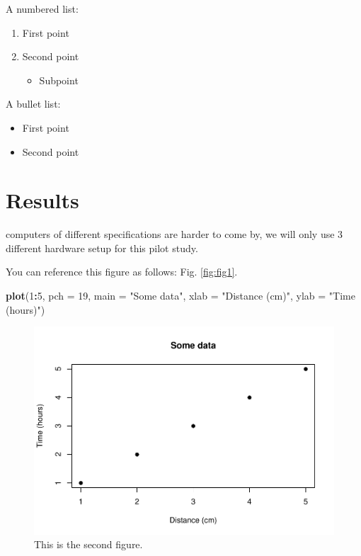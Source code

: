\documentclass[12pt,halfline,a4paper,]{ouparticle}
\newenvironment{Shaded}{\begin{snugshade}}{\end{snugshade}}
\newcommand{\AttributeTok}[1]{\textcolor[rgb]{0.13,0.29,0.53}{#1}}
\newcommand{\DecValTok}[1]{\textcolor[rgb]{0.00,0.00,0.81}{#1}}
\newcommand{\FunctionTok}[1]{\textcolor[rgb]{0.13,0.29,0.53}{\textbf{#1}}}
\newcommand{\NormalTok}[1]{#1}
\newcommand{\SpecialCharTok}[1]{\textcolor[rgb]{0.81,0.36,0.00}{\textbf{#1}}}
\newcommand{\StringTok}[1]{\textcolor[rgb]{0.31,0.60,0.02}{#1}}
\providecommand{\tightlist}{%
  \setlength{\itemsep}{0pt}\setlength{\parskip}{0pt}}
\begin{document}
A numbered list:

\begin{enumerate}
\def\labelenumi{\arabic{enumi})}
\tightlist
\item
  First point
\item
  Second point

  \begin{itemize}
  \tightlist
  \item
    Subpoint
  \end{itemize}
\end{enumerate}

A bullet list:

\begin{itemize}
\tightlist
\item
  First point
\item
  Second point
\end{itemize}

\hypertarget{results}{%
\section{Results}\label{results}}

computers of different specifications are harder to come by, we will
only use 3 different hardware setup for this pilot study.

You can reference this figure as follows: Fig. \ref{fig:fig1}.

\begin{Shaded}
\begin{Highlighting}[]
\FunctionTok{plot}\NormalTok{(}\DecValTok{1}\SpecialCharTok{:}\DecValTok{5}\NormalTok{, }\AttributeTok{pch =} \DecValTok{19}\NormalTok{, }\AttributeTok{main =} \StringTok{"Some data"}\NormalTok{, }\AttributeTok{xlab =} \StringTok{"Distance (cm)"}\NormalTok{, }\AttributeTok{ylab =} \StringTok{"Time (hours)"}\NormalTok{)}
\end{Highlighting}
\end{Shaded}

\begin{figure}[p]
\includegraphics[width=1\linewidth]{skeleton_files/figure-latex/fig2-1} \caption{This is the second figure.}\label{fig:fig2}
\end{figure}
\end{document}
